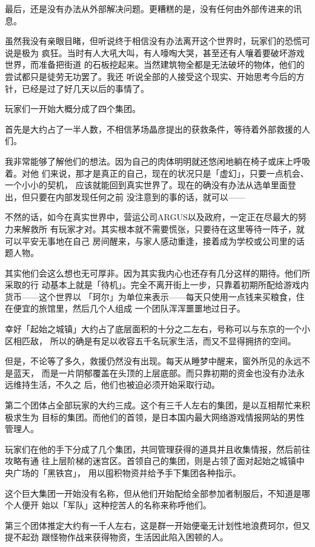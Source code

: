 \documentclass[11pt]{book}
\begin{document}
最后，还是没有办法从外部解决问题。更糟糕的是，没有任何由外部传进来的讯息。

虽然我没有亲眼目睹，但听说终于相信没有办法离开这个世界时，玩家们的恐慌可说是极为
疯狂。当时有人大吼大叫，有人嚎啕大哭，甚至还有人嚷着要破坏游戏世界，而准备把街道
的石板挖起来。当然建筑物全都是无法破坏的物体，他们的尝试都只是徒劳无功罢了。我还
听说全部的人接受这个现实、开始思考今后的方针，已经是过了好几天以后的事情了。

玩家们一开始大概分成了四个集团。

首先是大约占了一半人数，不相信茅场晶彦提出的获救条件，等待着外部救援的人们。

我非常能够了解他们的想法。因为自己的肉体明明就还悠闲地躺在椅子或床上呼吸着。对他
们来说，那才是真正的自己，现在的状况只是「虚幻」，只要一点机会、一个小小的契机，
应该就能回到真实世界了。现在的确没有办法从选单里面登出，但只要在内部发现任何之前
没注意到的事的话，就可以——

不然的话，如今在真实世界中，营运公司ARGUS以及政府，一定正在尽最大的努力来解救所
有玩家才对。其实根本就不需要慌张，只要待在这里等待一阵子，就可以平安无事地在自己
房间醒来，与家人感动重逢，接着成为学校或公司里的话题人物。

其实他们会这么想也无可厚非。因为其实我内心也还存有几分这样的期待。他们所采取的行
动基本上就是「待机」。完全不离开街上一步，只靠着初期所配给游戏内货币——这个世界以
「珂尔」为单位来表示——每天只使用一点钱来买粮食，住在便宜的旅馆里，然后几个人组成
一个团队浑浑噩噩地过日子。

幸好「起始之城镇」大约占了底层面积的十分之二左右，号称可以与东京的一个小区相匹敌，
所以的确是有足以收容五千名玩家生活，而又不显得拥挤的空间。

但是，不论等了多久，救援仍然没有出现。每天从睡梦中醒来，窗外所见的永远不是蓝天，
而是一片阴郁覆盖在头顶的上层底部。而只靠初期的资金也没有办法永远维持生活，不久之
后，他们也被迫必须开始采取行动。

第二个团体占全部玩家的大约三成。这个有三千人左右的集团，是以互相帮忙来积极求生为
目标的集团。而他们的首领，是日本国内最大网络游戏情报网站的男性管理人。

玩家们在他的手下分成了几个集团，共同管理获得的道具并且收集情报，然后前往攻略有通
往上层阶梯的迷宫区。首领自己的集团，则是占领了面对起始之城镇中央广场的「黑铁宫」，
用以囤积物资并给予手下集团各种指示。

这个巨大集团一开始没有名称，但从他们开始配给全部参加者制服后，不知道是哪个人便开
始以「军队」这种挖苦人的名称来称呼他们。

第三个团体推定大约有一千人左右，这是群一开始便毫无计划性地浪费珂尔，但又提不起劲
跟怪物作战来获得物资，生活因此陷入困顿的人。
\end{document}
